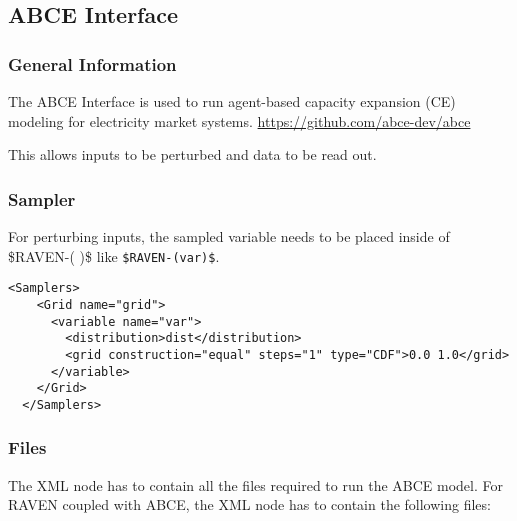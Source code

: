 \subsection{ABCE Interface}
\label{subsec:AbceInterface}

\subsubsection{General Information}
The ABCE Interface is used to run agent-based 
capacity expansion (CE) modeling for electricity market systems. 
\url{https://github.com/abce-dev/abce}

This allows inputs to be perturbed and data to be read out.

\subsubsection{Sampler}

For perturbing inputs, the sampled variable needs to be placed inside
of \$RAVEN-( )\$ like \verb'$RAVEN-(var)$'. 

\begin{lstlisting}[style=XML]
  <Samplers>
    <Grid name="grid">
      <variable name="var">
        <distribution>dist</distribution>
        <grid construction="equal" steps="1" type="CDF">0.0 1.0</grid>
      </variable>
    </Grid>
  </Samplers>
\end{lstlisting}


\subsubsection{Files}

The  XML node has to contain all the files required to run
the ABCE model. 
For RAVEN coupled with ABCE, the  XML node has to contain
the following files:

